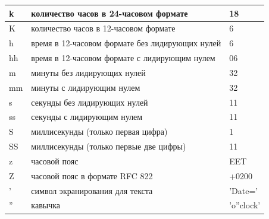 \begin{longtable}[r]{|>{\ttfamily\centering}m{1.8cm}|m{11.7cm}|m{1.8cm}|}
	k & количество часов в 24-часовом формате & 18 \\\hline
	K & количество часов в 12-часовом формате & 6 \\\hline
	h & время в 12-часовом формате без лидирующих нулей & 6 \\\hline
	hh & время в 12-часовом формате с лидирующим нулем & 06 \\\hline
	m & минуты без лидирующих нулей & 32 \\\hline
	mm & минуты с лидирующим нулем & 32 \\\hline
	s & секунды без лидирующих нулей & 11 \\\hline
	ss & секунды с лидирующим нулем & 11 \\\hline
	S & миллисекунды (только первая цифра) & 1 \\\hline
	SS & миллисекунды (только первые две цифры)	 & 11 \\\hline
	z & часовой пояс & EET \\\hline
	Z & часовой пояс в формате RFC 822 & +0200 \\\hline
	' & символ экранирования для текста & 'Date=' \\\hline
	'' & кавычка & 'o''clock' \\\hline	
\end{longtable}


